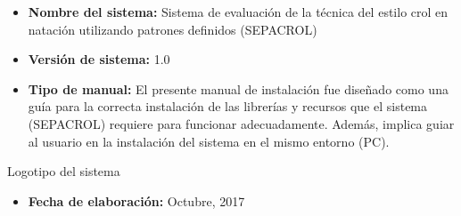 \begin{itemize}
    \item \textbf{Nombre del sistema:} Sistema de evaluación de la técnica 
    del estilo crol en natación utilizando patrones definidos (SEPACROL)
    \item \textbf{Versión de sistema:} 1.0
    \item \textbf{Tipo de manual:} El presente manual de instalación fue diseñado 
    como una guía para la correcta instalación de las librerías y recursos que el 
    sistema (SEPACROL) requiere para funcionar adecuadamente. Además, implica guiar 
    al usuario en la instalación del sistema en el mismo entorno (PC).
\end{itemize}
Logotipo del sistema
\begin{itemize}
    \item \textbf{Fecha de elaboración:} Octubre, 2017
\end{itemize}
